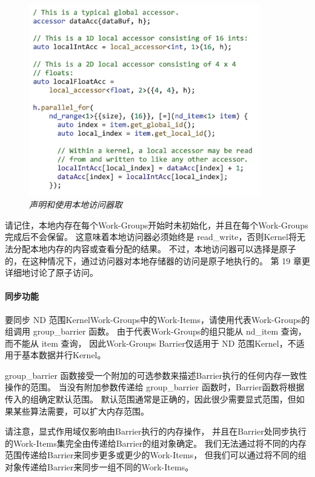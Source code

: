 \begin{figure}[H]
	\centering
	\includegraphics[width=0.9\textwidth]{figs/F9.7.png}
	\caption{\textit{声明和使用本地访问器取 }}
\end{figure}

请记住，本地内存在每个Work-Groups开始时未初始化，并且在每个Work-Groups完成后不会保留。 
这意味着本地访问器必须始终是 read\_write，否则Kernel将无法分配本地内存的内容或查看分配的结果。 
不过，本地访问器可以选择是原子的，在这种情况下，通过访问器对本地存储器的访问是原子地执行的。 
第 19 章更详细地讨论了原子访问。

\paragraph{同步功能}

要同步 ND 范围KernelWork-Groups中的Work-Items，请使用代表Work-Groups的组调用 group\_barrier 函数。 
由于代表Work-Groups的组只能从 nd\_item 查询，而不能从 item 查询，
因此Work-Groups Barrier仅适用于 ND 范围Kernel，不适用于基本数据并行Kernel。

group\_barrier 函数接受一个附加的可选参数来描述Barrier执行的任何内存一致性操作的范围。 
当没有附加参数传递给 group\_barrier 函数时，Barrier函数将根据传入的组确定默认范围。 
默认范围通常是正确的，因此很少需要显式范围，但如果某些算法需要，可以扩大内存范围。

请注意，显式作用域仅影响由Barrier执行的内存操作，
并且在Barrier处同步执行的Work-Items集完全由传递给Barrier的组对象确定。 
我们无法通过将不同的内存范围传递给Barrier来同步更多或更少的Work-Items，
但我们可以通过将不同的组对象传递给Barrier来同步一组不同的Work-Items。

